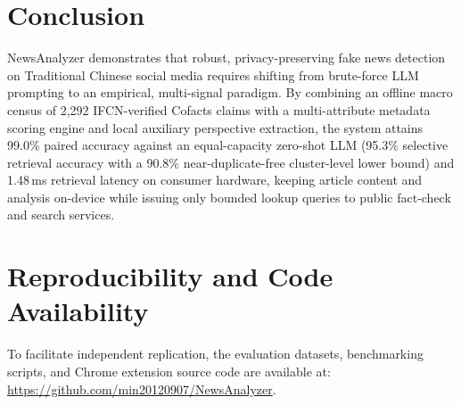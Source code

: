 \documentclass[twoside]{llncs}
\begin{document}
\section{Conclusion}

NewsAnalyzer demonstrates that robust, privacy-preserving fake news detection on Traditional Chinese social media requires shifting from brute-force LLM prompting to an empirical, multi-signal paradigm. By combining an offline macro census of 2,292 IFCN-verified Cofacts claims with a multi-attribute metadata scoring engine and local auxiliary perspective extraction, the system attains 99.0\% paired accuracy against an equal-capacity zero-shot LLM (95.3\% selective retrieval accuracy with a 90.8\% near-duplicate-free cluster-level lower bound) and 1.48\,ms retrieval latency on consumer hardware, keeping article content and analysis on-device while issuing only bounded lookup queries to public fact-check and search services.

\section*{Reproducibility and Code Availability}
To facilitate independent replication, the evaluation datasets, benchmarking scripts, and Chrome extension source code are available at: \url{https://github.com/min20120907/NewsAnalyzer}.
\end{document}
